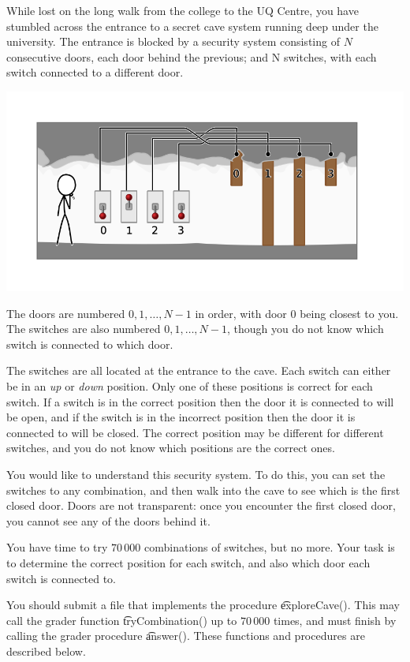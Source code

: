 While lost on the long walk from the college to the UQ Centre, you have stumbled across the entrance to a secret cave system running deep under the university. The entrance is blocked by a security system consisting of $N$ consecutive doors, each door behind the previous; and N switches, with each switch connected to a different door.

\includegraphics{cave1.png}

The doors are numbered $0, 1, \dots, N - 1$ in order, with door $0$ being closest to you. The switches are also numbered $0, 1, \dots, N - 1$, though you do not know which switch is connected to which door.

The switches are all located at the entrance to the cave. Each switch can either be in an \textit{up} or \textit{down} position. Only one of these positions is correct for each switch. If a switch is in the correct position then the door it is connected to will be open, and if the switch is in the incorrect position then the door it is connected to will be closed. The correct position may be different for different switches, and you do not know which positions are the correct ones.

You would like to understand this security system. To do this, you can set the switches to any combination, and then walk into the cave to see which is the first closed door. Doors are not transparent: once you encounter the first closed door, you cannot see any of the doors behind it.

You have time to try $70\,000$ combinations of switches, but no more. Your task is to determine the correct position for each switch, and also which door each switch is connected to.

You should submit a file that implements the procedure \t{exploreCave()}. This may call the grader function \t{tryCombination()} up to $70\,000$ times, and must finish by calling the grader procedure \t{answer()}. These functions and procedures are described below.


